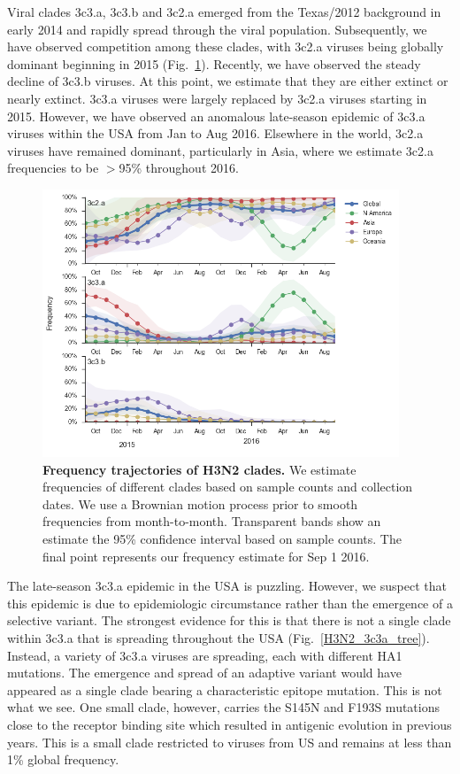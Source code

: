 \documentclass[11pt,oneside,letterpaper]{article}
\begin{document}
\pagebreak

Viral clades 3c3.a, 3c3.b and 3c2.a emerged from the Texas/2012 background in early 2014 and rapidly spread through the viral population. Subsequently, we have observed competition among these clades, with 3c2.a viruses being globally dominant beginning in 2015 (Fig.\ \ref{H3N2_clades}). Recently, we have observed the steady decline of 3c3.b viruses. At this point, we estimate that they are either extinct or nearly extinct. 3c3.a viruses were largely replaced by 3c2.a viruses starting in 2015. However, we have observed an anomalous late-season epidemic of 3c3.a viruses within the USA from Jan to Aug 2016. Elsewhere in the world, 3c2.a viruses have remained dominant, particularly in Asia, where we estimate 3c2.a frequencies to be $>$95\% throughout 2016.

\begin{figure}[H]
	\centering
	\includegraphics[width=0.95\textwidth]{../figures/sep-2016/H3N2_clades.png}
	\caption{\textbf{Frequency trajectories of H3N2 clades.}
	We estimate frequencies of different clades based on sample counts and collection dates.
	We use a Brownian motion process prior to smooth frequencies from month-to-month.
	Transparent bands show an estimate the 95\% confidence interval based on sample counts.
	The final point represents our frequency estimate for Sep 1 2016.
	}
	\label{H3N2_clades}
\end{figure}

\pagebreak

The late-season 3c3.a epidemic in the USA is puzzling. However, we suspect that this epidemic is due to epidemiologic circumstance rather than the emergence of a selective variant. The strongest evidence for this is that there is not a single clade within 3c3.a that is spreading throughout the USA (Fig.\ \ref{H3N2_3c3a_tree}). Instead, a variety of 3c3.a viruses are spreading, each with different HA1 mutations. The emergence and spread of an adaptive variant would have appeared as a single clade bearing a characteristic epitope mutation. This is not what we see. One small clade, however, carries the S145N and F193S mutations close to the receptor binding site which resulted in antigenic evolution in previous years. This is a small clade restricted to viruses from US and remains at less than 1\% global frequency.
\end{document}
